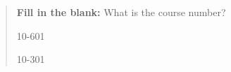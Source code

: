 \documentclass[11pt,addpoints,answers]{exam}
\begin{document}
\begin{quote}
\textbf{Fill in the blank:} What is the course number?

\begin{tcolorbox}[fit,height=1cm, width=4cm, blank, borderline={1pt}{-2pt},nobeforeafter]
    \begin{center}\huge10-601\end{center}
    \end{tcolorbox}\hspace{2cm}
    \begin{tcolorbox}[fit,height=1cm, width=4cm, blank, borderline={1pt}{-2pt},nobeforeafter]
    \begin{center}\huge10-301\end{center}
    \end{tcolorbox}
\end{quote}
\clearpage
\end{document}
